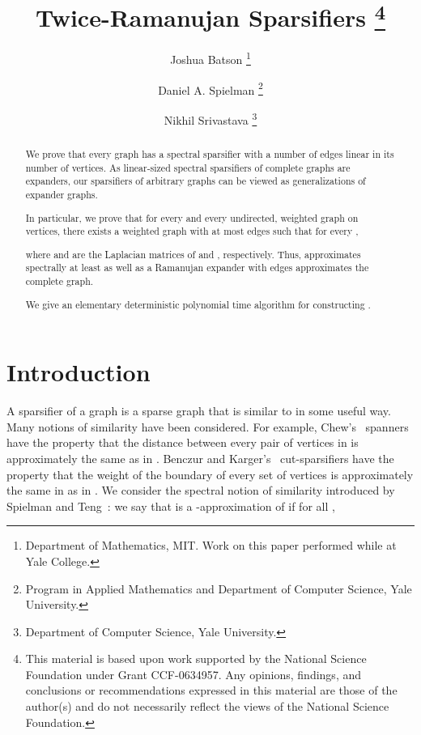 \documentclass[12pt]{article}
\begin{document}
\title{Twice-Ramanujan Sparsifiers
\thanks{
This material is based upon work supported by the National Science Foundation under Grant CCF-0634957.
Any opinions, findings, and conclusions or recommendations expressed in this material are those of the author(s) and do not necessarily reflect the views of the National Science Foundation.
}\\} 
 
\author{
Joshua Batson
\thanks{
Department of Mathematics, MIT. Work on this paper performed while at
Yale College.}\\
\and
Daniel A. Spielman
\thanks{
Program in Applied Mathematics and 
Department of Computer Science,
Yale University.}\\
\and
Nikhil Srivastava
\thanks{
Department of Computer Science,
Yale University.}
}

\maketitle
\begin{abstract}
We prove that every graph has a spectral sparsifier with a number
  of edges linear in its number of vertices.
As linear-sized spectral sparsifiers of complete graphs are expanders,
  our sparsifiers of arbitrary graphs 
  can be viewed as generalizations of
  expander graphs.

In particular, we prove that for every  and every
  undirected, weighted graph  on  vertices, there exists
  a weighted graph  with at most  edges
  such that for every ,

where  and  are the Laplacian matrices of 
  and , respectively. 
Thus, 
  approximates  spectrally at least as well as a Ramanujan expander
  with  edges approximates the complete graph.

We give an elementary deterministic polynomial time algorithm for
  constructing .
\end{abstract}

\section{Introduction}\label{sec:intro}
A sparsifier of a graph  is a sparse graph  that is similar to
   in some useful way.
Many notions of similarity have been considered.
For example, Chew's~\cite{PaulChew} spanners have the property that the distance
  between every pair of vertices in  is approximately the same as in .
Benczur and Karger's~\cite{BenczurKarger} cut-sparsifiers have the property
  that the weight of the boundary of every set of vertices is approximately
  the same in  as in .
We consider the spectral notion of similarity introduced
  by Spielman and Teng~\cite{SpielmanTengPrecon,SpielmanTengSparsifier}:
  we say that  is a -approximation of  if for all
  ,
\end{document}
